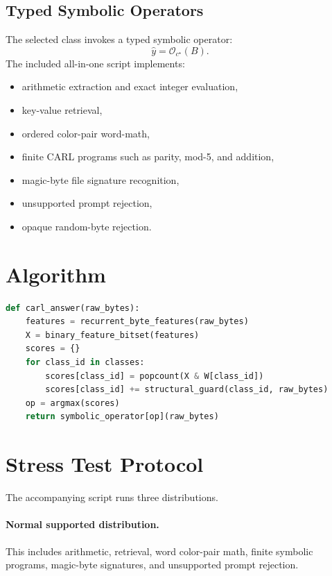 \documentclass[10pt]{article}
\newcommand{\CARL}{\textsc{CARL}}
\begin{document}
\subsection{Typed Symbolic Operators}

The selected class invokes a typed symbolic operator:
\[
\hat{y} = \mathcal{O}_{c^\star}(B).
\]
The included all-in-one script implements:
\begin{itemize}[leftmargin=1.5em]
  \item arithmetic extraction and exact integer evaluation,
  \item key-value retrieval,
  \item ordered color-pair word-math,
  \item finite \CARL{} programs such as parity, mod-5, and addition,
  \item magic-byte file signature recognition,
  \item unsupported prompt rejection,
  \item opaque random-byte rejection.
\end{itemize}

\section{Algorithm}

\begin{lstlisting}[language=Python, caption={CARL inference in simplified pseudocode.}]
def carl_answer(raw_bytes):
    features = recurrent_byte_features(raw_bytes)
    X = binary_feature_bitset(features)
    scores = {}
    for class_id in classes:
        scores[class_id] = popcount(X & W[class_id])
        scores[class_id] += structural_guard(class_id, raw_bytes)
    op = argmax(scores)
    return symbolic_operator[op](raw_bytes)
\end{lstlisting}

\section{Stress Test Protocol}

The accompanying script runs three distributions.

\paragraph{Normal supported distribution.}
This includes arithmetic, retrieval, word color-pair math, finite symbolic programs, magic-byte signatures, and unsupported prompt rejection.
\end{document}
